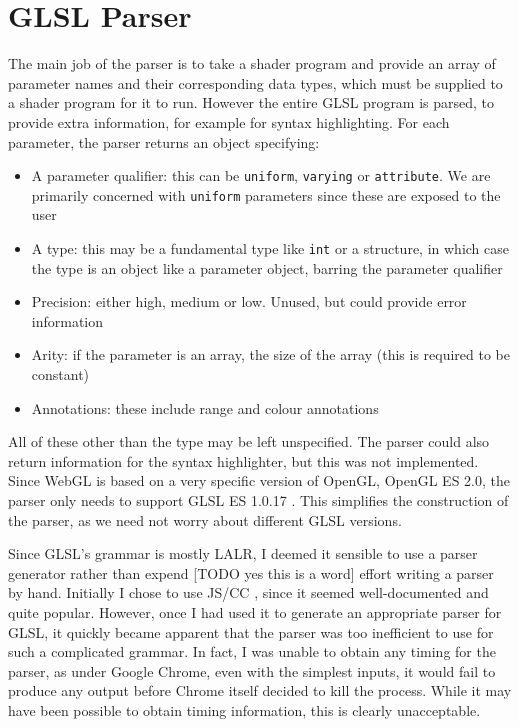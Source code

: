 \documentclass[12pt,twoside,notitlepage]{report}
\begin{document}
\section{GLSL Parser}
The main job of the parser is to take a shader program and provide an array of parameter names and their corresponding data types, which must be supplied to a shader program for it to run. However the entire GLSL program is parsed, to provide extra information, for example for syntax highlighting. For each parameter, the parser returns an object specifying:
\begin{itemize}
  \item A parameter qualifier: this can be \texttt{uniform}, \texttt{varying} or \texttt{attribute}. We are primarily concerned with \texttt{uniform} parameters since these are exposed to the user
  \item A type: this may be a fundamental type like \texttt{int} or a structure, in which case the type is an object like a parameter object, barring the parameter qualifier
  \item Precision: either high, medium or low. Unused, but could provide error information
  \item Arity: if the parameter is an array, the size of the array (this is required to be constant)
  \item Annotations: these include range and colour annotations
\end{itemize}
All of these other than the type may be left unspecified. The parser could also return information for the syntax highlighter, but this was not implemented. Since WebGL is based on a very specific version of OpenGL, OpenGL ES 2.0, the parser only needs to support GLSL ES 1.0.17 \citet{glsl-spec}\citet{webgl-spec}. This simplifies the construction of the parser, as we need not worry about different GLSL versions.

Since GLSL's grammar is mostly LALR, I deemed it sensible to use a parser generator rather than expend [TODO yes this is a word] effort writing a parser by hand. Initially I chose to use JS/CC \citet{js-cc}, since it seemed well-documented and quite popular. However, once I had used it to generate an appropriate parser for GLSL, it quickly became apparent that the parser was too inefficient to use for such a complicated grammar. In fact, I was unable to obtain any timing for the parser, as under Google Chrome, even with the simplest inputs, it would fail to produce any output before Chrome itself decided to kill the process. While it may have been possible to obtain timing information, this is clearly unacceptable. 
\end{document}
